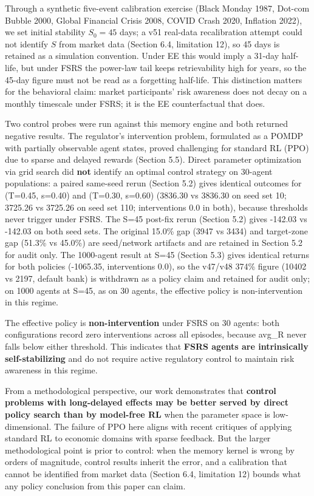 \documentclass[11pt]{article}
\begin{document}
Through a synthetic five-event calibration exercise (Black Monday 1987, Dot-com Bubble 2000, Global Financial Crisis 2008, COVID Crash 2020, Inflation 2022), we set initial stability $S_0 = 45$ days; a v51 real-data recalibration attempt could not identify $S$ from market data (Section 6.4, limitation 12), so 45 days is retained as a simulation convention. Under EE this would imply a 31-day half-life, but under FSRS the power-law tail keeps retrievability high for years, so the 45-day figure must not be read as a forgetting half-life. This distinction matters for the behavioral claim: market participants' risk awareness does not decay on a monthly timescale under FSRS; it is the EE counterfactual that does.

Two control probes were run against this memory engine and both returned negative results. The regulator's intervention problem, formulated as a POMDP with partially observable agent states, proved challenging for standard RL (PPO) due to sparse and delayed rewards (Section 5.5). Direct parameter optimization via grid search did \textbf{not} identify an optimal control strategy on 30-agent populations: a paired same-seed rerun (Section 5.2) gives identical outcomes for (T=0.45, s=0.40) and (T=0.30, s=0.60) (3836.30 vs 3836.30 on seed set 10; 3725.26 vs 3725.26 on seed set 110; interventions 0.0 in both), because thresholds never trigger under FSRS. The S=45 post-fix rerun (Section 5.2) gives -142.03 vs -142.03 on both seed sets. The original 15.0\% gap (3947 vs 3434) and target-zone gap (51.3\% vs 45.0\%) are seed/network artifacts and are retained in Section 5.2 for audit only. The 1000-agent result at S=45 (Section 5.3) gives identical returns for both policies (-1065.35, interventions 0.0), so the v47/v48 374\% figure (10402 vs 2197, default bank) is withdrawn as a policy claim and retained for audit only; on 1000 agents at S=45, as on 30 agents, the effective policy is non-intervention in this regime.

The effective policy is \textbf{non-intervention} under FSRS on 30 agents: both configurations record zero interventions across all episodes, because avg\_R never falls below either threshold. This indicates that \textbf{FSRS agents are intrinsically self-stabilizing} and do not require active regulatory control to maintain risk awareness in this regime.

From a methodological perspective, our work demonstrates that \textbf{control problems with long-delayed effects may be better served by direct policy search than by model-free RL} when the parameter space is low-dimensional. The failure of PPO here aligns with recent critiques of applying standard RL to economic domains with sparse feedback. But the larger methodological point is prior to control: when the memory kernel is wrong by orders of magnitude, control results inherit the error, and a calibration that cannot be identified from market data (Section 6.4, limitation 12) bounds what any policy conclusion from this paper can claim.
\end{document}
